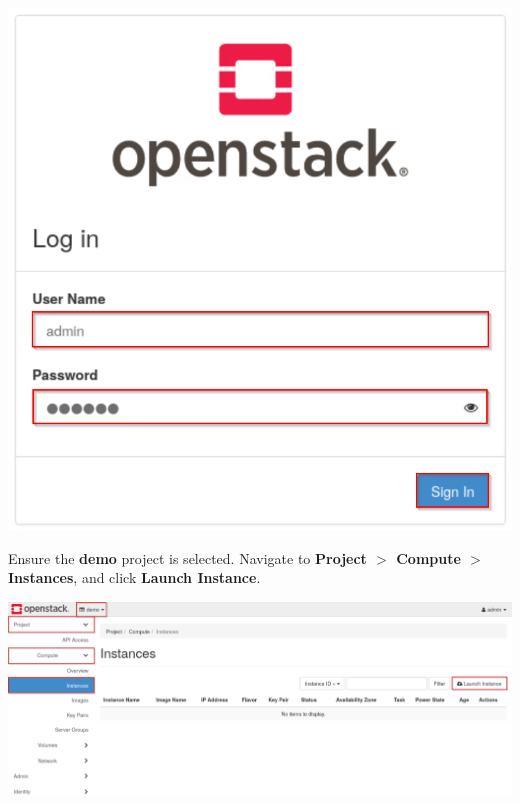 \documentclass[letterpaper, 12pt]{article}
\begin{document}
\begin{enumerate}
\begin{labstep}
        \begin{center}
            \includegraphics[scale=0.5]{images/part1/step3.png}
        \end{center}
    \end{labstep}

    \begin{labstep}
        Ensure the \textbf{demo} project is selected.
        Navigate to \textbf{Project $>$ Compute $>$ Instances}, and click \textbf{Launch Instance}.

        \begin{center}
            \includegraphics[width=\linewidth]{images/part1/step4.png}
        \end{center}
    \end{labstep}


\end{enumerate}
\end{document}
